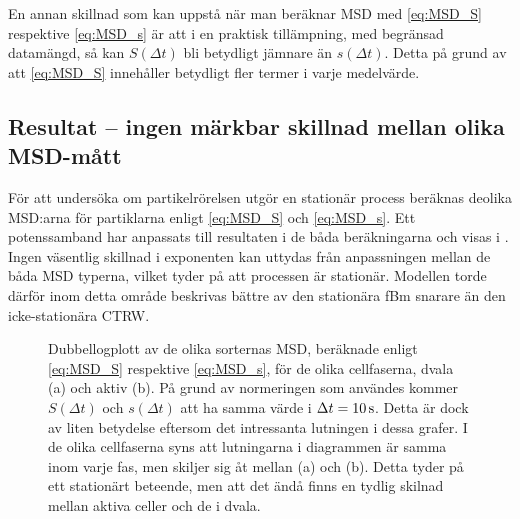 En annan skillnad som kan uppstå när man beräknar MSD med \eqref{eq:MSD_S} respektive \eqref{eq:MSD_s} är att i en praktisk tillämpning, med begränsad datamängd, så kan $S(\Delta{t})$ bli betydligt jämnare än $s(\Delta{t})$. Detta på grund av att \eqref{eq:MSD_S} innehåller betydligt fler termer i varje medelvärde. 


\subsection{Resultat -- ingen märkbar skillnad mellan olika MSD-mått}

För att undersöka om partikelrörelsen utgör en stationär process beräknas deolika MSD:arna för partiklarna enligt \eqref{eq:MSD_S} och \eqref{eq:MSD_s}. Ett potenssamband har anpassats till resultaten i de båda beräkningarna och visas i . 
Ingen väsentlig skillnad i exponenten kan uttydas från anpassningen mellan de båda MSD typerna, vilket tyder på att processen är stationär. Modellen torde därför inom detta område beskrivas bättre av den stationära fBm snarare än den icke-stationära CTRW.

\begin{figure}\centerline{
\subfigure[][]{

}
\subfigure[][]{

}
}
\caption{Dubbellogplott av de olika sorternas MSD, beräknade enligt \eqref{eq:MSD_S} respektive \eqref{eq:MSD_s}, för de olika cellfaserna, dvala (a) och aktiv (b). På grund av normeringen som användes kommer $S(\Delta{t})$ och $s(\Delta{t})$ att ha samma värde i $\Delta{t}=\unit[10]{s}$. Detta är dock av liten betydelse eftersom det intressanta lutningen i dessa grafer. I de olika cellfaserna syns att lutningarna i diagrammen är samma inom varje fas, men skiljer sig åt mellan (a) och (b). Detta tyder på ett stationärt beteende, men att det ändå finns en tydlig skilnad mellan aktiva celler och de i dvala. %
}
\label{fig:MSD}
\end{figure}

